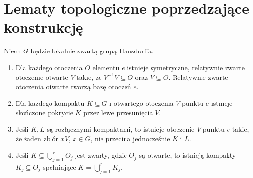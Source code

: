 \section{Lematy topologiczne poprzedzające konstrukcję}
\begin{lemat}
\label{lem:haar-neigh-23}
Niech $G$ będzie lokalnie zwartą grupą Hausdorffa.
\begin{enumerate}[label=(\roman*)]
\item Dla każdego otoczenia $O$ elementu $e$ istnieje symetryczne,
  relatywnie zwarte otoczenie otwarte $V$ takie, że
  $V^{-1}V\subseteq O$ oraz $\overline V\subseteq O$.
  Relatywnie zwarte otoczenia otwarte
  tworzą bazę otoczeń $e$.
\item Dla każdego kompaktu $K\subseteq G$ i otwartego otoczenia
  $V$ punktu $e$ istnieje skończone pokrycie $K$
  przez lewe przesunięcia $V$.
\item Jeśli $K,L$ są rozłącznymi kompaktami, to istnieje otoczenie
  $V$ punktu $e$ takie, że żaden zbiór $xV$, $x\in G$,
  nie przecina jednocześnie $K$ i $L$.
\item Jeśli $K\subseteq\bigcup_{j=1}^r O_j$ jest zwarty,
  gdzie $O_j$ są otwarte, to istnieją kompakty
  $K_j\subseteq O_j$ spełniające $K=\bigcup_{j=1}^rK_j$.
\end{enumerate}
\end{lemat}
